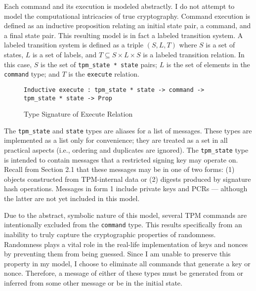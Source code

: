 Each command and its execution is modeled abstractly. I do not attempt to model the computational intricacies of true cryptography. Command execution is defined as an inductive proposition relating an initial state pair, a command, and a final state pair. This resulting model is in fact a labeled transition system. A labeled transition system is defined as a triple $(S,L,T)$ where $S$ is a set of states, $L$ is a set of labels, and $T \subseteq S \times L \times S$ is a labeled transition relation. In this case, $S$ is the set of \verb|tpm_state * state| pairs; $L$ is the set of elements in the \verb|command| type; and $T$ is the \verb|execute| relation. 
\begin{figure}[h]
\begin{lstlisting}[language=Coq]
Inductive execute : tpm_state * state -> command -> tpm_state * state -> Prop
\end{lstlisting}
\caption{Type Signature of Execute Relation}
\end{figure}
The \verb|tpm_state| and \verb|state| types are aliases for a list of messages. These types are implemented as a list only for convenience; they are treated as a set in all practical aspects (i.e., ordering and duplicates are ignored). The \verb|tpm_state| type is intended to contain messages that a restricted signing key may operate on. Recall from Section 2.1 that these messages may be in one of two forms: (1) objects constructed from TPM-internal data or (2) digests produced by signature hash operations. Messages in form 1 include private keys and PCRs --- although the latter are not yet included in this model. 

Due to the abstract, symbolic nature of this model, several TPM commands are intentionally excluded from the \verb|command| type. This results specifically from an inability to truly capture the cryptographic properties of randomness. Randomness plays a vital role in the real-life implementation of keys and nonces by preventing them from being guessed. Since I am unable to preserve this property in my model, I choose to eliminate all commands that generate a key or nonce. Therefore, a message of either of these types must be generated from or inferred from some other message or be in the initial state. 

